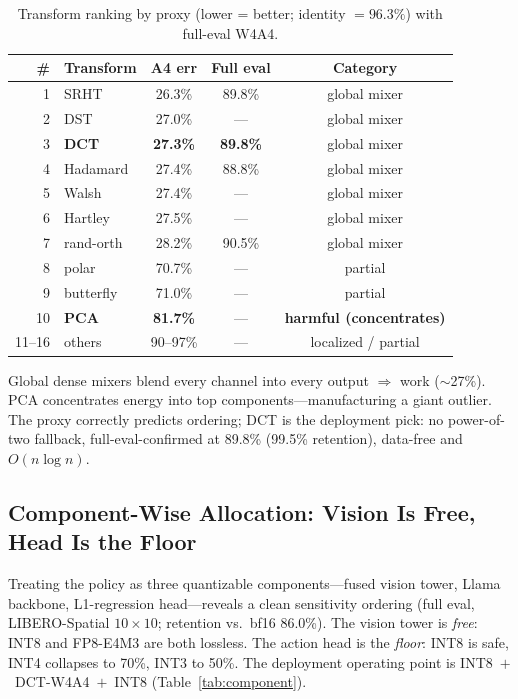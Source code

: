 \documentclass[conference]{IEEEtran}
\begin{document}
\begin{table}[h]\centering
\caption{Transform ranking by proxy (lower = better; identity $= 96.3\%$) with full-eval W4A4.}
\label{tab:rank}
\begin{tabular}{rlccc}
\toprule
\# & Transform & A4 err & Full eval & Category \\
\midrule
1 & SRHT & 26.3\% & 89.8\% & global mixer \\
2 & DST & 27.0\% & --- & global mixer \\
3 & \textbf{DCT} & \textbf{27.3\%} & \textbf{89.8\%} & global mixer \\
4 & Hadamard & 27.4\% & 88.8\% & global mixer \\
5 & Walsh & 27.4\% & --- & global mixer \\
6 & Hartley & 27.5\% & --- & global mixer \\
7 & rand-orth & 28.2\% & 90.5\% & global mixer \\
8 & polar & 70.7\% & --- & partial \\
9 & butterfly & 71.0\% & --- & partial \\
10 & \textbf{PCA} & \textbf{81.7\%} & --- & \textbf{harmful (concentrates)} \\
11--16 & others & 90--97\% & --- & localized / partial \\
\bottomrule
\end{tabular}
\end{table}

Global dense mixers blend every channel into every output $\Rightarrow$ work ($\sim$27\%).
PCA concentrates energy into top components---manufacturing a giant outlier. The proxy correctly
predicts ordering; DCT is the deployment pick: no power-of-two fallback, full-eval-confirmed at
89.8\% (99.5\% retention), data-free and $O(n\log n)$.

\subsection{Component-Wise Allocation: Vision Is Free, Head Is the Floor}
\label{sec:component}

Treating the policy as three quantizable components---fused vision tower, Llama backbone,
L1-regression head---reveals a clean sensitivity ordering (full eval, LIBERO-Spatial $10\times10$;
retention vs.\ bf16 86.0\%). The vision tower is \emph{free}: INT8 and FP8-E4M3 are both
lossless. The action head is the \emph{floor}: INT8 is safe, INT4 collapses to 70\%, INT3 to 50\%.
The deployment operating point is INT8~$+$~DCT-W4A4~$+$~INT8 (Table~\ref{tab:component}).
\end{document}
